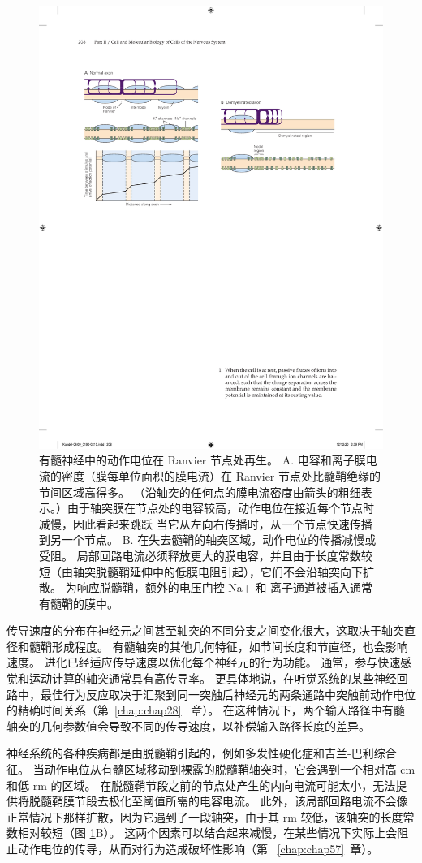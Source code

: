\begin{figure}[htbp]
	\centering
	\includegraphics[width=0.5\linewidth]{chap09/fig_9_13}
	\caption{有髓神经中的动作电位在 Ranvier 节点处再生。 A. 电容和离子膜电流的密度（膜每单位面积的膜电流）在 Ranvier 节点处比髓鞘绝缘的节间区域高得多。 （沿轴突的任何点的膜电流密度由箭头的粗细表示。）由于轴突膜在节点处的电容较高，动作电位在接近每个节点时减慢，因此看起来跳跃 当它从左向右传播时，从一个节点快速传播到另一个节点。 B. 在失去髓鞘的轴突区域，动作电位的传播减慢或受阻。 局部回路电流必须释放更大的膜电容，并且由于长度常数较短（由轴突脱髓鞘延伸中的低膜电阻引起），它们不会沿轴突向下扩散。 为响应脱髓鞘，额外的电压门控 Na+ 和  离子通道被插入通常有髓鞘的膜中。}
	\label{fig:9_13}
\end{figure}


传导速度的分布在神经元之间甚至轴突的不同分支之间变化很大，这取决于轴突直径和髓鞘形成程度。
有髓轴突的其他几何特征，如节间长度和节直径，也会影响速度。
进化已经适应传导速度以优化每个神经元的行为功能。 
通常，参与快速感觉和运动计算的轴突通常具有高传导率。
更具体地说，在听觉系统的某些神经回路中，最佳行为反应取决于汇聚到同一突触后神经元的两条通路中突触前动作电位的精确时间关系（第~\ref{chap:chap28}~ 章）。
在这种情况下，两个输入路径中有髓轴突的几何参数值会导致不同的传导速度，以补偿输入路径长度的差异。


神经系统的各种疾病都是由脱髓鞘引起的，例如多发性硬化症和吉兰-巴利综合征。
当动作电位从有髓区域移动到裸露的脱髓鞘轴突时，它会遇到一个相对高 cm 和低 rm 的区域。
在脱髓鞘节段之前的节点处产生的内向电流可能太小，无法提供将脱髓鞘膜节段去极化至阈值所需的电容电流。
此外，该局部回路电流不会像正常情况下那样扩散，因为它遇到了一段轴突，由于其 rm 较低，该轴突的长度常数相对较短（图 \ref{fig:9_13}B）。
这两个因素可以结合起来减慢，在某些情况下实际上会阻止动作电位的传导，从而对行为造成破坏性影响（第 ~\ref{chap:chap57}~章）。

